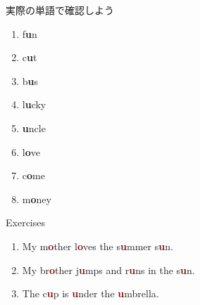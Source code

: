 \documentclass[aspectratio=169,xcolor={dvipsnames,table}]{beamer}
\begin{document}
\begin{frame}[plain]{実際の単語で確認しよう}
\LARGE
\hfill{\scriptsize {}}

\begin{enumerate}
 \item f\textcolor{NavyBlue}{\bfseries u}n%
\hfill{}\hspace{150pt}\mbox{}
 \item c\textcolor{NavyBlue}{\bfseries u}t%
\hfill{}\hspace{150pt}\mbox{}
 \item b\textcolor{NavyBlue}{\bfseries u}s%
\hfill{}\hspace{150pt}\mbox{}
 \item l\textcolor{NavyBlue}{\bfseries u}cky%
\hfill{}\hspace{150pt}\mbox{}
 \item \textcolor{NavyBlue}{\bfseries u}ncle%
\hfill{}\hspace{150pt}\mbox{}
 \item l\textcolor{NavyBlue}{\bfseries o}ve%
\hfill{}\hspace{150pt}\mbox{} 
\item c\textcolor{NavyBlue}{\bfseries o}me%
\hfill{}\hspace{150pt}\mbox{}
 \item m\textcolor{NavyBlue}{\bfseries o}ney%
\hfill{}\hspace{150pt}\mbox{}
\end{enumerate}
\end{frame}
\begin{frame}[plain]{Exercises }
\LARGE

\begin{enumerate}
 \item My m\textcolor{Maroon}{\bfseries o}ther l\textcolor{Maroon}{\bfseries o}ves the s\textcolor{Maroon}{\bfseries u}mmer s\textcolor{Maroon}{\bfseries u}n.
 \item My br\textcolor{Maroon}{\bfseries o}ther j\textcolor{Maroon}{\bfseries u}mps and r\textcolor{Maroon}{\bfseries u}ns in the s\textcolor{Maroon}{\bfseries u}n.
 \item The c\textcolor{Maroon}{\bfseries u}p is \textcolor{Maroon}{\bfseries u}nder the \textcolor{Maroon}{\bfseries u}mbrella.
\end{enumerate}

\hfill{\scriptsize {}}

\end{frame}
\end{document}
